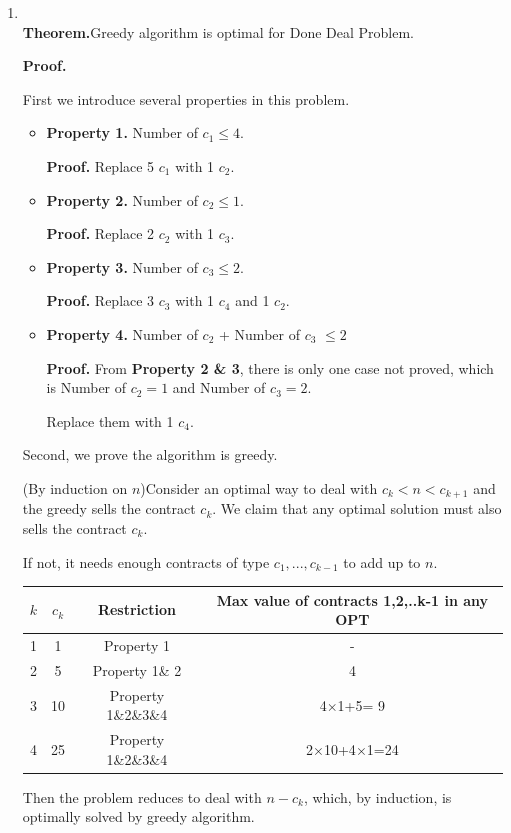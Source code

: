 \documentclass[12pt,a4paper]{article}
\makeatletter
\newtheorem*{solution}{Solution}
\theoremstyle{definition}
\renewenvironment{solution}[1][Solution] {\par\pushQED{\qed}\normalfont\topsep6\p@\@plus6\p@\relax\trivlist\item[\hskip\labelsep\bfseries#1\@addpunct{.}]\ignorespaces}{\popQED\endtrivlist\@endpefalse} \makeatother
\makeatother
\begin{document}
\begin{enumerate}
\begin{solution}
\begin{enumerate}
\begin{algorithm}[H]
	\end{algorithm}
~\\	
\textbf{Theorem.}Greedy algorithm is optimal for Done Deal Problem.

\textbf{Proof.}

First we introduce several properties in this problem.
\begin{itemize}
\item \textbf{Property 1.} Number of $c_1\leq4$.

\textbf{Proof.} Replace 5 $c_1$ with 1 $c_2$.

\item \textbf{Property 2.} Number of $c_2\leq 1$.

\textbf{Proof.} Replace 2 $c_2$ with 1 $c_3$.

\item \textbf{Property 3.} Number of $c_3\leq2$.

\textbf{Proof.} Replace 3 $c_3$ with 1 $c_4$ and 1 $c_2$.

\item \textbf{Property 4.} Number of $c_2$ + Number of $c_3$ $\leq2$

\textbf{Proof.} From \textbf{Property 2 \& 3}, there is only one case not proved, which is Number of $c_2=1$ and Number of $c_3=2$.

Replace them with 1 $c_4$.

\end{itemize}

Second, we prove the algorithm is greedy.

(By induction on $n$)Consider an optimal way to deal with $c_k<n<c_{k+1}$ and the greedy sells the contract $c_k$. We claim that any optimal solution must also  sells the contract $c_k$.

If not, it needs enough contracts of type $c_1, ...,c_{k-1}$ to add up to $n$.

\begin{tabular}{|c|c|c|c|}
\hline
$k$ & $c_k$ & Restriction &Max value of contracts 1,2,..k-1 in any OPT\\
\hline
1 & 1 & Property 1 & -\\
\hline
2 & 5 &Property 1\& 2 &4\\
\hline
3 & 10 &Property 1\&2\&3\&4 & 4$\times$1+5= 9\\
\hline
4 & 25 &Property 1\&2\&3\&4 & 2$\times$10+4$\times$1=24\\
\hline
\end{tabular}

Then the problem reduces to deal with $n-c_k$, which, by induction, is optimally solved by greedy algorithm.


\end{enumerate}
\end{solution}
\end{enumerate}
\end{document}
